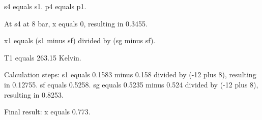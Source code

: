 s4 equals s1.  
p4 equals p1.  

At s4 at 8 bar, x equals 0, resulting in 0.3455.  

x1 equals (s1 minus sf) divided by (sg minus sf).  

T1 equals 263.15 Kelvin.  

Calculation steps:  
s1 equals 0.1583 minus 0.158 divided by (-12 plus 8), resulting in 0.12755.  
sf equals 0.5258.  
sg equals 0.5235 minus 0.524 divided by (-12 plus 8), resulting in 0.8253.  

Final result:  
x equals 0.773.